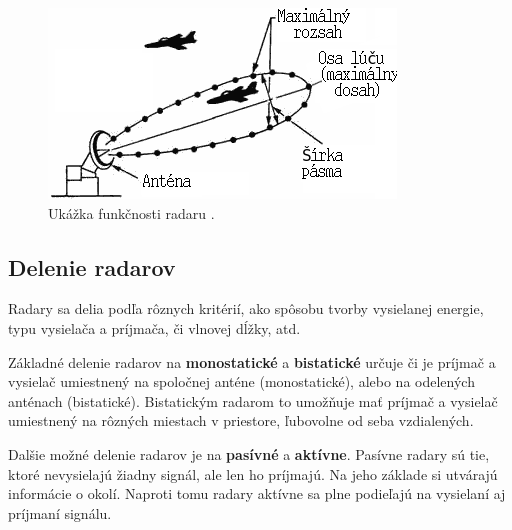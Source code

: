   \begin{figure}[h]
      \centering
      \includegraphics[width=.6\textwidth]{obrazky-figures/radarsk.png}
      \caption{Ukážka funkčnosti radaru \cite{radarimage}.}
      \label{fig:radar}
  \end{figure}

  \subsection{Delenie radarov}
    \hspace{0.6cm}Radary sa delia podľa rôznych kritérií, ako spôsobu tvorby vysielanej energie, typu vysielača a príjmača, či vlnovej dĺžky, atd.

    Základné delenie radarov na \textbf{monostatické} a \textbf{bistatické} určuje či je príjmač a vysielač umiestnený na spoločnej anténe (monostatické), alebo na odelených anténach (bistatické). Bistatickým radarom to umožňuje mať príjmač a vysielač umiestnený na rôzných miestach v priestore, ľubovolne od seba vzdialených\cite{radarsystems}\cite{radarsystem}.

    Dalšie možné delenie radarov je na \textbf{pasívné} a \textbf{aktívne}. Pasívne radary sú tie, ktoré nevysielajú žiadny signál, ale len ho príjmajú. Na jeho základe si utvárajú informácie o okolí. Naproti tomu radary aktívne sa plne podieľajú na vysielaní aj príjmaní signálu.

